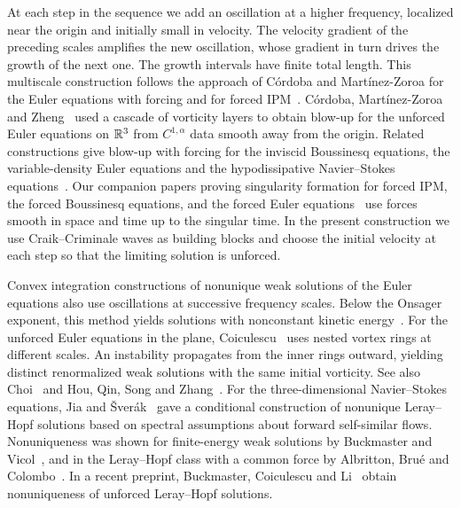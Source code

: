 At each step in the sequence we add an oscillation at a higher frequency, localized
near the origin and initially small in velocity. The velocity gradient
of the preceding scales amplifies the new oscillation, whose gradient
in turn drives the growth of the next one. The growth intervals have
finite total length. This multiscale construction follows the approach of C\'ordoba and
Mart\'inez-Zoroa for the Euler equations with forcing and for forced
IPM~\cite{CMZForcedEuler,CMZForcedIPM}.
C\'ordoba, Mart\'inez-Zoroa and Zheng~\cite{CMZUnforcedEuler} used a cascade of
vorticity layers to obtain blow-up for the unforced Euler equations
on $\mathbb R^3$ from $C^{1,\alpha}$ data
smooth away from the origin. Related constructions give blow-up with forcing
for the inviscid Boussinesq equations, the variable-density Euler equations
and the hypodissipative Navier--Stokes equations~\cite{CLMZForcedBoussinesq,CLMZNonhomogeneousEuler,CMZHypodissipativeNS}.
Our companion papers proving singularity formation for forced IPM,
the forced Boussinesq equations, and the forced Euler
equations~\cite{AlpogeBuckmasterCoiculescuIPM,AlpogeBuckmasterBoussinesq,AlpogeBuckmasterForcedEuler}
use forces smooth in space and time up to the singular time. In the
present construction we use Craik--Criminale waves as building blocks
and choose the initial velocity at each step so that the limiting
solution is unforced.

Convex integration constructions of nonunique weak solutions of the Euler equations
also use oscillations at successive frequency scales. Below the Onsager
exponent, this method yields solutions with nonconstant kinetic
energy~\cite{IsettOnsager,BDLSVOnsager}. For the unforced Euler equations
in the plane, Coiculescu~\cite{CoiculescuEulerI,CoiculescuEulerII}
uses nested vortex rings at different scales. An instability propagates
from the inner rings outward, yielding distinct renormalized weak
solutions with the same initial vorticity. See also Choi~\cite{ChoiEulerNonuniqueness} and Hou, Qin, Song and
Zhang~\cite{HouQinSongZhangEulerNonuniqueness}.
For the three-dimensional Navier--Stokes equations, Jia and
\v{S}ver\'ak~\cite{JiaSverak2015} gave a conditional construction of
nonunique Leray--Hopf solutions based
on spectral assumptions about forward self-similar flows.
Nonuniqueness was shown for
finite-energy weak solutions by Buckmaster and Vicol~\cite{BuckmasterVicolNS},
and in the Leray--Hopf class with a common force by Albritton, Bru\'e and
Colombo~\cite{AlbrittonBrueColombo}. In a recent preprint, Buckmaster,
Coiculescu and Li~\cite{BuckmasterCoiculescuLiNS} obtain nonuniqueness
of unforced Leray--Hopf solutions.


